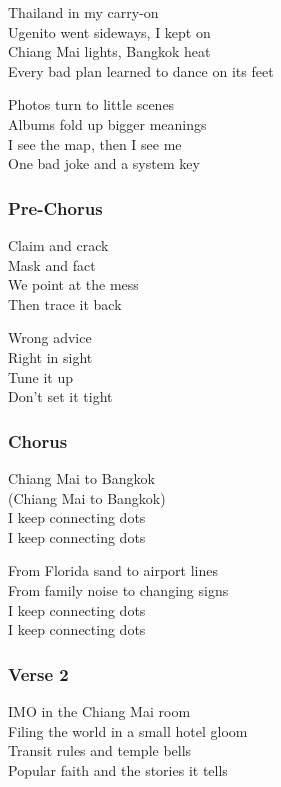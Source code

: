 \documentclass[]{article}
\begin{document}
Thailand in my carry-on\\
Ugenito went sideways, I kept on\\
Chiang Mai lights, Bangkok heat\\
Every bad plan learned to dance on its feet

Photos turn to little scenes\\
Albums fold up bigger meanings\\
I see the map, then I see me\\
One bad joke and a system key

\subsubsection{Pre-Chorus}\label{pre-chorus-59}

Claim and crack\\
Mask and fact\\
We point at the mess\\
Then trace it back

Wrong advice\\
Right in sight\\
Tune it up\\
Don't set it tight

\subsubsection{Chorus}\label{chorus-88}

Chiang Mai to Bangkok\\
(Chiang Mai to Bangkok)\\
I keep connecting dots\\
I keep connecting dots

From Florida sand to airport lines\\
From family noise to changing signs\\
I keep connecting dots\\
I keep connecting dots

\subsubsection{Verse 2}\label{verse-2-26}

IMO in the Chiang Mai room\\
Filing the world in a small hotel gloom\\
Transit rules and temple bells\\
Popular faith and the stories it tells
\end{document}
